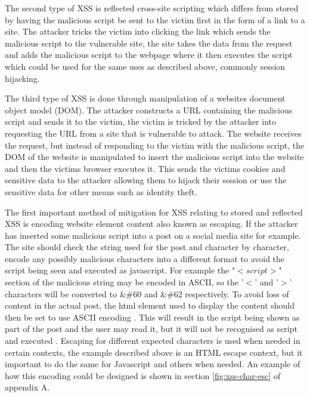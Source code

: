 \documentclass{ueacmpstyle}
\begin{document}
      The second type of XSS is reflected cross-site scripting which differs from stored 
      by having the malicious script be sent to the victim first in the form of a link to 
      a site. The attacker tricks the victim into clicking the link which sends the 
      malicious script to the vulnerable site, the site takes the data from the request and 
      adds the malicious script to the webpage where it then executes the script which could 
      be used for the same uses as described above, commonly session hijacking.

      The third type of XSS is done through manipulation of a websites document object model 
      (DOM). The attacker constructs a URL containing the malicious script and sends it to 
      the victim, the victim is tricked by the attacker into requesting the URL from a site 
      that is vulnerable to attack. The website receives the request, but instead of 
      responding to the victim with the malicious script, the DOM of the website is manipulated 
      to insert the malicious script into the website and then the victims browser executes it. 
      This sends the victims cookies and sensitive data to the attacker allowing them to hijack 
      their session or use the sensitive data for other means such as identity theft.

      The first important method of mitigation for XSS relating to stored and reflected XSS is 
      encoding website element content also known as escaping. If the attacker has inserted 
      some malicious script into a post on a social media site for example. The site should 
      check the string used for the post and character by character, encode any possibly 
      malicious characters into a different format to avoid the script being seen and 
      executed as javascript. For example the "$<script>$" section of the malicious string 
      may be encoded in ASCII, so the '$<$' and '$>$' characters will be converted to \&\#60 
      and \&\#62 respectively. To avoid loss of content in the actual post, the html element 
      used to display the content should then be set to use ASCII encoding . This will result 
      in the script being shown as part of the post and the user may read it, but it will not 
      be recognised as script and executed \citep{IBMProtectFromXSS}. Escaping for different 
      expected characters is used when needed in certain contexts, the example described 
      above is an HTML escape context, but it important to do the same for Javascript and 
      others when needed. An example of how this encoding could be designed is shown in 
      section \ref{fig:xss-char-esc} of appendix A. 
\end{document}

